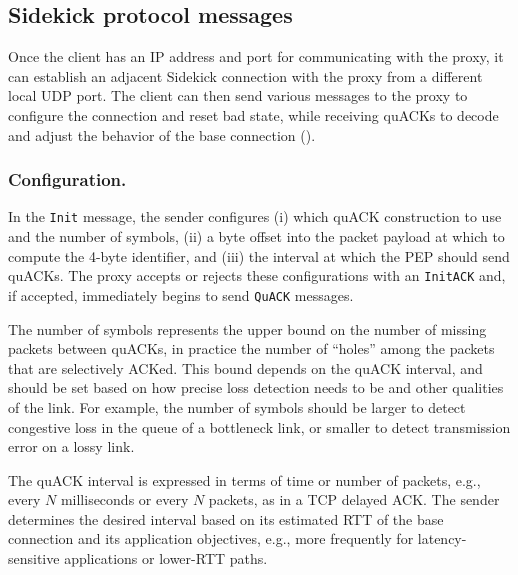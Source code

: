 

\subsection{Sidekick protocol messages}



Once the client has an IP address and port for communicating with the proxy, it
can establish an adjacent Sidekick connection with the proxy from a different
local UDP port. The client can then send various messages to the proxy to
configure the connection and reset bad state, while receiving quACKs to decode
and adjust the behavior of the base connection ().

\subsubsection{Configuration.}
In the \texttt{Init} message, the sender configures (i) which quACK construction
to use and the number of symbols, (ii) a byte offset into the packet payload at
which to compute the 4-byte identifier, and (iii) the interval at which the PEP
should send quACKs.
The proxy accepts or rejects these configurations with an \texttt{InitACK}
and, if accepted, immediately begins to send \texttt{QuACK} messages.

The number of symbols represents the upper bound on the number of missing
packets between quACKs, in practice the number of ``holes'' among the packets
that are selectively ACKed. This bound depends on the quACK interval, and
should be set based on how precise loss detection needs to be and other
qualities of the link. For example, the number of symbols should be larger to
detect congestive loss in the queue of a bottleneck link, or smaller to detect
transmission error on a lossy link.

The quACK interval is expressed in terms of time or number of packets,
 e.g., every $N$ milliseconds or every $N$ packets, as in a TCP delayed ACK.
The sender determines the desired interval based on its estimated
RTT of the base connection and its application objectives, e.g.,
more frequently for latency-sensitive applications or lower-RTT paths.

